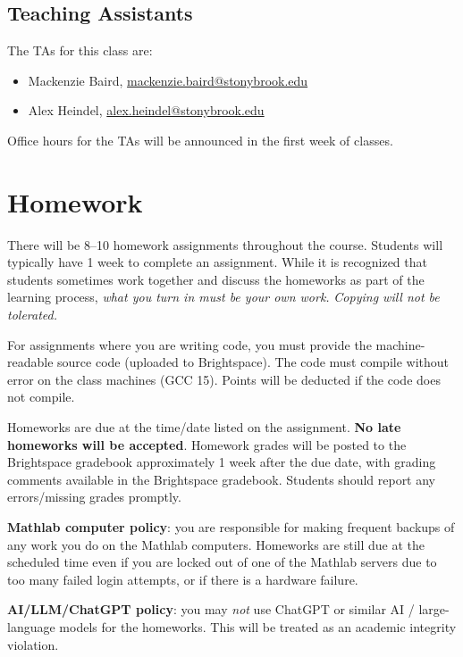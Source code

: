 \documentclass[10pt]{article}
\begin{document}
\subsection{Teaching Assistants}

The TAs for this class are:
\begin{itemize}
\item Mackenzie Baird, \href{mailto:mackenzie.baird@stonybrook.edu}{mackenzie.baird@stonybrook.edu}
\item Alex Heindel, \href{mailto:alex.heindel@stonybrook.edu}{alex.heindel@stonybrook.edu}
\end{itemize}
Office hours for the TAs will be announced in the first week of classes.

\section{Homework}

There will be 8--10
homework assignments throughout the course.  Students will typically
have 1 week to complete an assignment.  While it is recognized that
students sometimes work together and discuss the homeworks as part of
the learning process, {\em what you turn in must be your own work.}
{\em Copying will not be tolerated.}

For assignments where you are writing code, you must provide the
machine-readable source code (uploaded to Brightspace).  The code
must compile without error on the class machines (GCC 15).  Points
will be deducted if the code does not compile.

Homeworks are due at the time/date listed on the assignment.  {\bf No
  late homeworks will be accepted}.  Homework grades will be posted to
the Brightspace gradebook approximately 1 week after the due date,
with grading comments available in the Brightspace gradebook.
Students should report any errors/missing grades promptly.

{\bf Mathlab computer policy}: you are responsible for making frequent
backups of any work you do on the Mathlab computers.  Homeworks are
still due at the scheduled time even if you are locked out of one of
the Mathlab servers due to too many failed login attempts, or if there
is a hardware failure.

{\bf AI/LLM/ChatGPT policy}: you may {\em not} use ChatGPT or similar
AI / large-language models for the homeworks.  This will be treated
as an academic integrity violation.
\end{document}
